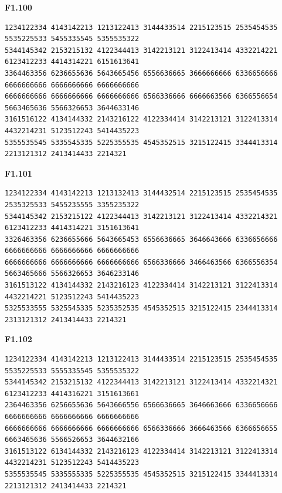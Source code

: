 \noindent\begin{minipage}{\linewidth}\textbf{F1.100}
\begin{lstlisting}
1234122334 4143142213 1213122413 3144433514 2215123515 2535454535 5535225533 5455335545 5355535322
5344145342 2153215132 4122344413 3142213121 3122413414 4332214221 6123412233 4414314221 6151613641
3364463356 6236655636 5643665456 6556636665 3666666666 6336656666 6666666666 6666666666 6666666666
6666666666 6666666666 6666666666 6566336666 6666663566 6366556654 5663465636 5566326653 3644633146
3161516122 4134144332 2143216122 4122334414 3142213121 3122413314 4432214231 5123512243 5414435223
5355535545 5335545335 5225355535 4545352515 3215122415 3344413314 2213121312 2413414433 2214321
\end{lstlisting}
\end{minipage}\par\smallskip

\noindent\begin{minipage}{\linewidth}\textbf{F1.101}
\begin{lstlisting}
1234122334 4143142213 1213132413 3144432514 2215123515 2535454535 2535325533 5455235555 3355235322
5344145342 2153215122 4122344413 3142213121 3122413414 4332214321 6123412233 4414314221 3151613641
3326463356 6236655666 5643665453 6556636665 3646643666 6336656666 6666666666 6666666666 6666666666
6666666666 6666666666 6666666666 6566336666 3466463566 6366556354 5663465666 5566326653 3646233146
3161513122 4134144332 2143216123 4122334414 3142213121 3122413314 4432214221 5123512243 5414435223
5325533555 5325545335 5235352535 4545352515 3215122415 2344413314 2313121312 2413414433 2214321
\end{lstlisting}
\end{minipage}\par\smallskip

\noindent\begin{minipage}{\linewidth}\textbf{F1.102}
\begin{lstlisting}
1234122334 4143142213 1213122413 3144433514 2215123515 2535454535 5535225533 5555335545 5355535322
5344145342 2153215132 4122344413 3142213121 3122413414 4332214321 6123412233 4414316221 3151613661
2364463356 6256655636 5643666556 6566636665 3646663666 6336656666 6666666666 6666666666 6666666666
6666666666 6666666666 6666666666 6566336666 3666463566 6366656655 6663465636 5566526653 3644632166
3161513122 6134144332 2143216123 4122334414 3142213121 3122413314 4432214231 5123512243 5414435223
5355535545 5335555335 5225355535 4545352515 3215122415 3344413314 2213121312 2413414433 2214321
\end{lstlisting}
\end{minipage}\par\smallskip

